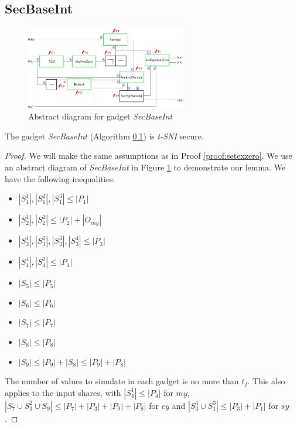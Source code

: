 \documentclass[runningheads]{llncs}
\begin{document}
\subsection{SecBaseInt}
\label{alg:secbaseint}
\begin{figure}[!ht]
    \includegraphics[width=7cm]{figure/secbaseint.pdf}
    \caption{Abstract diagram for gadget \emph{SecBaseInt}}
    \label{fig:secbaseint}
\end{figure}
\begin{lemma}\label{lem:secbaseint}
    The gadget \emph{SecBaseInt} (Algorithm \ref{alg:secbaseint}) is \emph{t-SNI} secure.    
\end{lemma}
\begin{proof}
    We will make the same assumptions as in Proof \ref{proof:setexzero}. We use an abstract diagram of \emph{SecBaseInt} in Figure \ref{fig:secbaseint} to demonstrate our lemma. We have the following inequalities:
    \begin{multicols}{2}
        \begin{itemize}
            \item $|S_1^1|,|S_1^2|,|S_1^3|\leq|P_1|$
            \item $|S_2^1|,|S_2^2|\leq|P_2| + |O_{my}|$
            \item $|S_3^1|,|S_3^2|, |S_3^3|, |S_3^4| \leq|P_3|$
            \item $|S_4^1|,|S_4^2|\leq|P_4|$
            \item $|S_5| \leq |P_5|$
            \item $|S_6| \leq |P_6|$
            \item $|S_7| \leq |P_7|$
            \item $|S_8| \leq |P_8|$
            \item $|S_9| \leq |P_9| + |S_8| \leq |P_9| + |P_8|$
        \end{itemize}
    \end{multicols}
    The number of values to simulate in each gadget is no more than $t_I$. This also applies to the input shares, with $|S_4^1| \leq |P_4|$ for $my$, $|S_7 \cup S_3^2 \cup S_9| \leq |P_7| + |P_3| + |P_9| + |P_8|$ for $ey$ and $|S_3^4 \cup S_1^3| \leq |P_3| + |P_1|$ for $sy$.
\end{proof}
\end{document}
